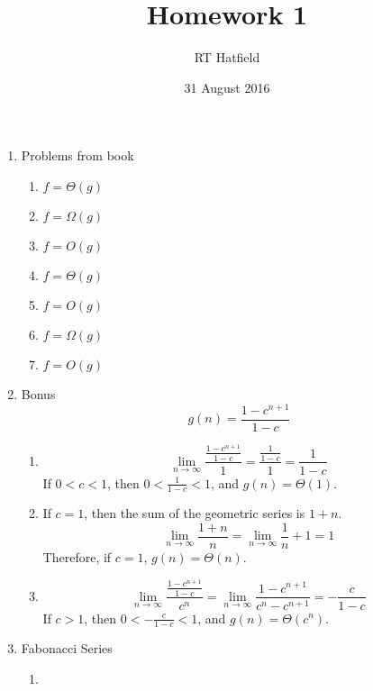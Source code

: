 \documentclass{article}
\title{Homework 1}
\author{RT Hatfield}
\date{31 August 2016}
\begin{document}
    \maketitle
    \begin{enumerate}
        \item Problems from book
        \begin{enumerate}
            \item $f = \Theta(g)$
            \item $f = \Omega(g)$
            \item $f = O(g)$
            \item $f = \Theta(g)$
            \item $f = O(g)$
            \item $f = \Omega(g)$
            \item $f = O(g)$
        \end{enumerate}
        \item Bonus
            \begin{equation}
                \ g(n) = \frac{1 - c^{n+1}}{1-c}
            \end{equation}
            \begin{enumerate}
                \item $$\lim_{n \to \infty}\frac{\frac{1 - c^{n+1}}{1-c}}{1} = \frac{\frac{1}{1-c}}{1} = \frac{1}{1-c} $$
                If $0 < c < 1$, then $0 < \frac{1}{1-c} < 1$, and $g(n) = \Theta(1)$.
                \item If $c = 1$, then the sum of the geometric series is $1 + n$.  $$\lim_{n \to \infty}\frac{1 + n}{n} = \lim_{n \to \infty}\frac{1}{n} + 1 = 1$$
                Therefore, if $c=1$, $g(n) = \Theta(n)$.
                \item $$\lim_{n \to \infty}\frac{\frac{1 - c^{n+1}}{1-c}}{c^n} = \lim_{n \to \infty}\frac{1 - c^{n+1}}{c^n - c^{n+1}} = -\frac{c}{1-c} $$
                If $c > 1$, then $0 < -\frac{c}{1-c} < 1$, and $g(n) = \Theta(c^n)$. 
            \end{enumerate}
        \item Fabonacci Series
        \begin{enumerate}
            \item \begin{algorithm}[H]
                \Else{
}
\end{algorithm}
\end{enumerate}
\end{enumerate}
\end{document}
